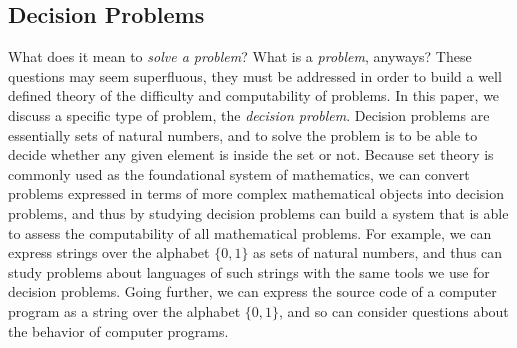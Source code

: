 \documentclass[psamsfonts]{amsart}
\theoremstyle{definition}
\theoremstyle{remark}
\numberwithin{equation}{section}
\begin{document}
\subsection{Decision Problems}
What does it mean to \emph{solve a problem}? What is a \emph{problem}, anyways?
These questions may seem superfluous, they must be addressed in order to build a
well defined theory of the difficulty and computability of problems. In this paper, we discuss a
specific type of problem, the \emph{decision problem}. Decision problems are
essentially sets of natural numbers, and to solve the problem is to be able to
decide whether any given element is inside the set or not. Because set theory is
commonly used as the foundational system of mathematics, we can convert problems
expressed in terms of more complex mathematical objects into decision problems,
and thus by studying decision problems can build a system that is able to assess
the computability of all mathematical problems. For example, we can express
strings over the alphabet $\{0,1\}$ as sets of natural numbers, and thus can
study problems about languages of such strings with the same tools we use for
decision problems. Going further, we can express the source code of a computer
program as a string over the alphabet $\{0,1\}$, and so can consider questions
about the behavior of computer programs.
\end{document}
